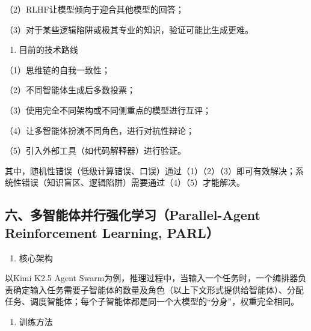 （2）RLHF让模型倾向于迎合其他模型的回答；

（3）对于某些逻辑陷阱或极其专业的知识，验证可能比生成更难。

\begin{enumerate}
\def\labelenumi{\arabic{enumi}.}
\setcounter{enumi}{2}
\tightlist
\item
  目前的技术路线
\end{enumerate}

（1）思维链的自我一致性；

（2）不同智能体生成后多数投票；

（3）使用完全不同架构或不同侧重点的模型进行互评；

（4）让多智能体扮演不同角色，进行对抗性辩论；

（5）引入外部工具（如代码解释器）进行验证。

其中，随机性错误（低级计算错误、口误）通过（1）（2）（3）即可有效解决；系统性错误（知识盲区、逻辑陷阱）需要通过（4）（5）才能解决。

\hypertarget{ux516dux591aux667aux80fdux4f53ux5e76ux884cux5f3aux5316ux5b66ux4e60parallel-agent-reinforcement-learning-parl}{%
\subsection{六、多智能体并行强化学习（Parallel-Agent Reinforcement Learning, PARL）}\label{ux516dux591aux667aux80fdux4f53ux5e76ux884cux5f3aux5316ux5b66ux4e60parallel-agent-reinforcement-learning-parl}}

\begin{enumerate}
\def\labelenumi{\arabic{enumi}.}
\tightlist
\item
  核心架构
\end{enumerate}

以Kimi K2.5 Agent Swarm为例，推理过程中，当输入一个任务时，一个编排器负责确定输入任务需要子智能体的数量及角色（以上下文形式提供给智能体）、分配任务、调度智能体；每个子智能体都是同一个大模型的``分身''，权重完全相同。

\begin{enumerate}
\def\labelenumi{\arabic{enumi}.}
\setcounter{enumi}{1}
\tightlist
\item
  训练方法
\end{enumerate}

